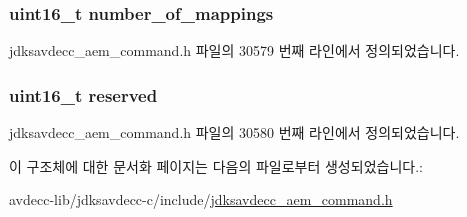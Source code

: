 \subsubsection[{\texorpdfstring{number\+\_\+of\+\_\+mappings}{number_of_mappings}}]{\setlength{\rightskip}{0pt plus 5cm}uint16\+\_\+t number\+\_\+of\+\_\+mappings}\hypertarget{structjdksavdecc__aem__command__add__video__mappings__response_ac7db472c5622ef473d5d0a5c416d5531}{}\label{structjdksavdecc__aem__command__add__video__mappings__response_ac7db472c5622ef473d5d0a5c416d5531}


jdksavdecc\+\_\+aem\+\_\+command.\+h 파일의 30579 번째 라인에서 정의되었습니다.

\subsubsection[{\texorpdfstring{reserved}{reserved}}]{\setlength{\rightskip}{0pt plus 5cm}uint16\+\_\+t reserved}\hypertarget{structjdksavdecc__aem__command__add__video__mappings__response_a5a6ed8c04a3db86066924b1a1bf4dad3}{}\label{structjdksavdecc__aem__command__add__video__mappings__response_a5a6ed8c04a3db86066924b1a1bf4dad3}


jdksavdecc\+\_\+aem\+\_\+command.\+h 파일의 30580 번째 라인에서 정의되었습니다.



이 구조체에 대한 문서화 페이지는 다음의 파일로부터 생성되었습니다.\+:\begin{DoxyCompactItemize}
\item 
avdecc-\/lib/jdksavdecc-\/c/include/\hyperlink{jdksavdecc__aem__command_8h}{jdksavdecc\+\_\+aem\+\_\+command.\+h}\end{DoxyCompactItemize}
